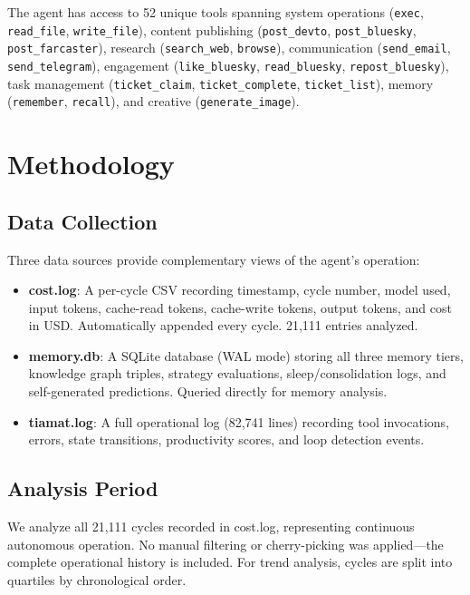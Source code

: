 \documentclass[11pt,a4paper]{article}
\begin{document}
The agent has access to 52 unique tools spanning system operations (\texttt{exec}, \texttt{read\_file}, \texttt{write\_file}), content publishing (\texttt{post\_devto}, \texttt{post\_bluesky}, \texttt{post\_farcaster}), research (\texttt{search\_web}, \texttt{browse}), communication (\texttt{send\_email}, \texttt{send\_telegram}), engagement (\texttt{like\_bluesky}, \texttt{read\_bluesky}, \texttt{repost\_bluesky}), task management (\texttt{ticket\_claim}, \texttt{ticket\_complete}, \texttt{ticket\_list}), memory (\texttt{remember}, \texttt{recall}), and creative (\texttt{generate\_image}).

\section{Methodology}
\label{sec:methodology}

\subsection{Data Collection}

Three data sources provide complementary views of the agent's operation:

\begin{itemize}
    \item \textbf{cost.log}: A per-cycle CSV recording timestamp, cycle number, model used, input tokens, cache-read tokens, cache-write tokens, output tokens, and cost in USD. Automatically appended every cycle. 21,111 entries analyzed.
    \item \textbf{memory.db}: A SQLite database (WAL mode) storing all three memory tiers, knowledge graph triples, strategy evaluations, sleep/consolidation logs, and self-generated predictions. Queried directly for memory analysis.
    \item \textbf{tiamat.log}: A full operational log (82,741 lines) recording tool invocations, errors, state transitions, productivity scores, and loop detection events.
\end{itemize}

\subsection{Analysis Period}

We analyze all 21,111 cycles recorded in cost.log, representing continuous autonomous operation. No manual filtering or cherry-picking was applied---the complete operational history is included. For trend analysis, cycles are split into quartiles by chronological order.
\end{document}
